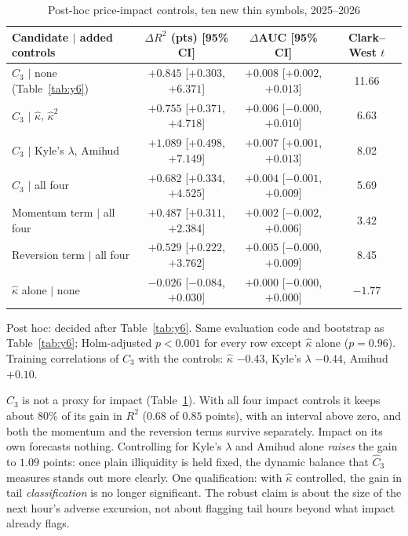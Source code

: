 \documentclass[12pt]{article}
\theoremstyle{definition}
\theoremstyle{remark}
\begin{document}
\begin{table}[t]\centering\small
\begin{threeparttable}
\caption{Post-hoc price-impact controls, ten new thin symbols, 2025--2026}\label{tab:y8}
\begin{tabular}{lccc}
\toprule
Candidate $\mid$ added controls & $\Delta R^2$ (pts) [95\% CI] & $\Delta$AUC [95\% CI] & Clark--West $t$\\
\midrule
$\hat C_3$ $\mid$ none (Table~\ref{tab:y6}) & $+0.845$ [$+0.303$, $+6.371$] & $+0.008$ [$+0.002$, $+0.013$] & 11.66\\
$\hat C_3$ $\mid$ $\hat\kappa$, $\hat\kappa^2$ & $+0.755$ [$+0.371$, $+4.718$] & $+0.006$ [$-0.000$, $+0.010$] & 6.63\\
$\hat C_3$ $\mid$ Kyle's $\lambda$, Amihud & $+1.089$ [$+0.498$, $+7.149$] & $+0.007$ [$+0.001$, $+0.013$] & 8.02\\
$\hat C_3$ $\mid$ all four & $+0.682$ [$+0.334$, $+4.525$] & $+0.004$ [$-0.001$, $+0.009$] & 5.69\\
Momentum term $\mid$ all four & $+0.487$ [$+0.311$, $+2.384$] & $+0.002$ [$-0.002$, $+0.006$] & 3.42\\
Reversion term $\mid$ all four & $+0.529$ [$+0.222$, $+3.762$] & $+0.005$ [$-0.000$, $+0.009$] & 8.45\\
$\hat\kappa$ alone $\mid$ none & $-0.026$ [$-0.084$, $+0.030$] & $+0.000$ [$-0.000$, $+0.000$] & $-1.77$\\
\bottomrule
\end{tabular}
\begin{tablenotes}\footnotesize\item Post hoc: decided after Table~\ref{tab:y6}. Same evaluation code and bootstrap as Table~\ref{tab:y6}; Holm-adjusted $p<0.001$ for every row except $\hat\kappa$ alone ($p=0.96$). Training correlations of $\hat C_3$ with the controls: $\hat\kappa$ $-0.43$, Kyle's $\lambda$ $-0.44$, Amihud $+0.10$. \end{tablenotes}
\end{threeparttable}
\end{table}

$\hat C_3$ is not a proxy for impact (Table~\ref{tab:y8}). With all four impact controls it keeps about 80\% of its gain in $R^2$ ($0.68$ of $0.85$ points), with an interval above zero, and both the momentum and the reversion terms survive separately. Impact on its own forecasts nothing. Controlling for Kyle's $\lambda$ and Amihud alone \emph{raises} the gain to $1.09$ points: once plain illiquidity is held fixed, the dynamic balance that $\hat C_3$ measures stands out more clearly. One qualification: with $\hat\kappa$ controlled, the gain in tail \emph{classification} is no longer significant. The robust claim is about the size of the next hour's adverse excursion, not about flagging tail hours beyond what impact already flags.
\end{document}
